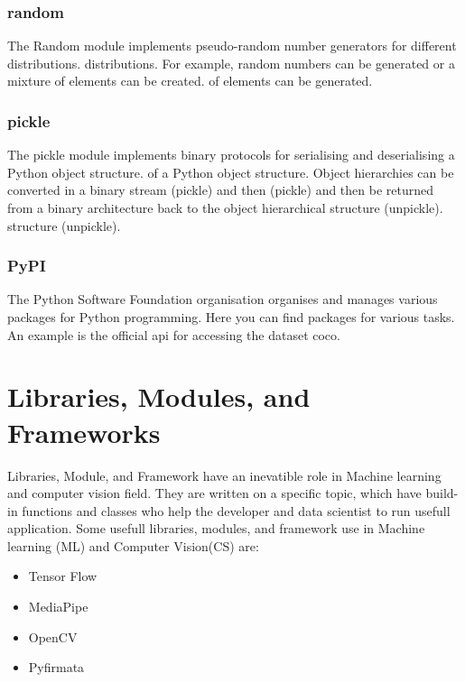 \subsection{random}

The Random module implements pseudo-random number generators for different distributions.
distributions. For example, random numbers can be generated or a mixture of elements can be created.
of elements can be generated. \cite{Python:2020e}

\subsection{pickle}

The pickle module implements binary protocols for serialising and deserialising a Python object structure. 
of a Python object structure. Object hierarchies can be converted in a binary stream (pickle) and then
(pickle) and then be returned from a binary architecture back to the object hierarchical structure (unpickle).
structure (unpickle). \cite{Python:2020d}

\subsection{PyPI}

The Python Software Foundation organisation organises and manages various packages for Python programming. \cite{PyPI:2021} Here you can find packages for various tasks. An example is the official \ac{api} for accessing the dataset \ac{coco}. \cite{PyPI:2021b}


\chapter{Libraries, Modules, and Frameworks}

Libraries, Module, and Framework have an inevatible role in Machine learning and computer vision field. They are written on a specific topic, which have build-in functions and classes who help the developer and data scientist to run usefull application. Some usefull libraries, modules, and framework use in Machine learning (ML) and Computer Vision(CS) are:
\begin{itemize}
	\item Tensor Flow
	\item MediaPipe
	\item OpenCV
	\item Pyfirmata
\end{itemize}

